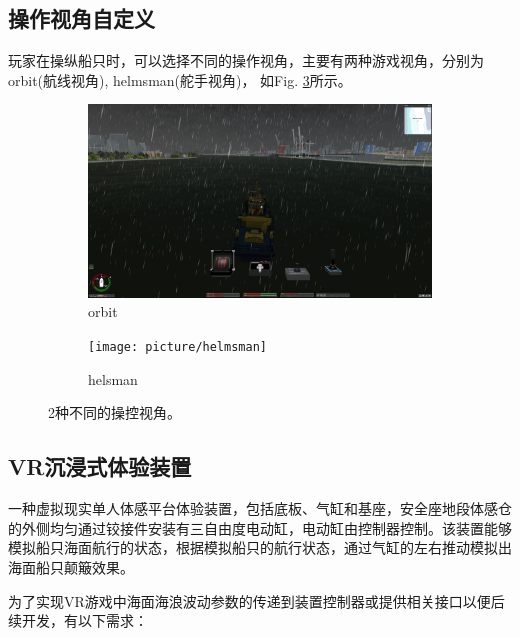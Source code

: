 \documentclass[a4paper,10pt]{article}
\begin{document}
		\subsection{操作视角自定义}
		
		玩家在操纵船只时，可以选择不同的操作视角，主要有两种游戏视角，分别为 orbit(航线视角), helmsman(舵手视角)， 如Fig. \ref{fig: View}所示。
		
		\begin{figure}[htbp] 
			\centering 
			
			\begin{subfigure}{0.3\textwidth}
				\includegraphics[width=\linewidth]{picture/orbit}
				\captionsetup{font=scriptsize}
				\caption{orbit}
				\label{fig: orbit}
			\end{subfigure}
			\begin{subfigure}{0.3\textwidth}
				\texttt{[image: picture/helmsman]}
				\captionsetup{font=scriptsize}
				\caption{helsman}
				\label{fig: helmsman}
			\end{subfigure}
			\captionsetup{font=scriptsize}
			\caption{
				\label{fig: View}						
				2种不同的操控视角。
			}
		\end{figure}
		
		\subsection{VR沉浸式体验装置}
		
		一种虚拟现实单人体感平台体验装置，包括底板、气缸和基座，安全座地段体感仓的外侧均匀通过铰接件安装有三自由度电动缸，电动缸由控制器控制。该装置能够模拟船只海面航行的状态，根据模拟船只的航行状态，通过气缸的左右推动模拟出海面船只颠簸效果。
		
		为了实现VR游戏中海面海浪波动参数的传递到装置控制器或提供相关接口以便后续开发，有以下需求：
		
\end{document}
